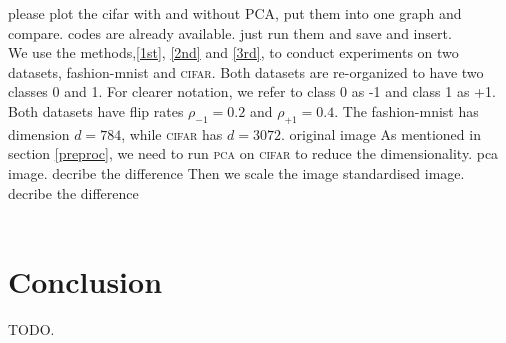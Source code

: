 \documentclass[12pt]{article} %
\newcommand{\rhoo}{\rho_{+1}}
\newcommand{\rhoz}{\rho_{-1}}
\begin{document}
{\color{red} please plot the cifar with and without PCA, put them into one graph and compare. codes are already available. just run them and save and insert.}\\
We use the methods,\ref{1st}, \ref{2nd} and \ref{3rd}, to conduct experiments on two datasets, fashion-mnist and \textsc{cifar}.
Both datasets are re-organized to have two classes 0 and 1. 
For clearer notation, we refer to class 0 as -1 and class 1 as +1. 
Both datasets have flip rates $\rhoz=0.2$ and $\rhoo=0.4$.
The fashion-mnist has dimension $d=784$, while \textsc{cifar} has $d=3072$. 
{\color{red} original image}
As mentioned in section \ref{preproc}, we need to run \textsc{pca} on \textsc{cifar} to reduce the dimensionality.
{\color{red} pca image. decribe the difference}
Then we scale the image
{\color{red} standardised image. decribe the difference} \\ \\


\section{Conclusion}
{\color{red} TODO.}\\

\label{headings}





\end{document}
